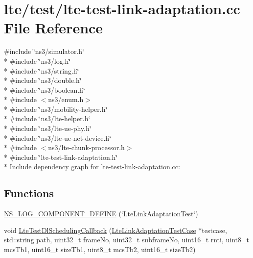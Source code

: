 \hypertarget{lte-test-link-adaptation_8cc}{}\section{lte/test/lte-\/test-\/link-\/adaptation.cc File Reference}
\label{lte-test-link-adaptation_8cc}
{\ttfamily \#include \char`\"{}ns3/simulator.\+h\char`\"{}}\\*
{\ttfamily \#include \char`\"{}ns3/log.\+h\char`\"{}}\\*
{\ttfamily \#include \char`\"{}ns3/string.\+h\char`\"{}}\\*
{\ttfamily \#include \char`\"{}ns3/double.\+h\char`\"{}}\\*
{\ttfamily \#include \char`\"{}ns3/boolean.\+h\char`\"{}}\\*
{\ttfamily \#include $<$ns3/enum.\+h$>$}\\*
{\ttfamily \#include \char`\"{}ns3/mobility-\/helper.\+h\char`\"{}}\\*
{\ttfamily \#include \char`\"{}ns3/lte-\/helper.\+h\char`\"{}}\\*
{\ttfamily \#include \char`\"{}ns3/lte-\/ue-\/phy.\+h\char`\"{}}\\*
{\ttfamily \#include \char`\"{}ns3/lte-\/ue-\/net-\/device.\+h\char`\"{}}\\*
{\ttfamily \#include $<$ns3/lte-\/chunk-\/processor.\+h$>$}\\*
{\ttfamily \#include \char`\"{}lte-\/test-\/link-\/adaptation.\+h\char`\"{}}\\*
Include dependency graph for lte-\/test-\/link-\/adaptation.cc\+:
\subsection*{Functions}
\begin{DoxyCompactItemize}
\item 
\hyperlink{lte-test-link-adaptation_8cc_a128cde1c677135f7fb31e226e208a8d9}{N\+S\+\_\+\+L\+O\+G\+\_\+\+C\+O\+M\+P\+O\+N\+E\+N\+T\+\_\+\+D\+E\+F\+I\+NE} (\char`\"{}Lte\+Link\+Adaptation\+Test\char`\"{})
\item 
void \hyperlink{lte-test-link-adaptation_8cc_ab208a94bcab8811af6875fa7750b8991}{Lte\+Test\+Dl\+Scheduling\+Callback} (\hyperlink{classLteLinkAdaptationTestCase}{Lte\+Link\+Adaptation\+Test\+Case} $\ast$testcase, std\+::string path, uint32\+\_\+t frame\+No, uint32\+\_\+t subframe\+No, uint16\+\_\+t rnti, uint8\+\_\+t mcs\+Tb1, uint16\+\_\+t size\+Tb1, uint8\+\_\+t mcs\+Tb2, uint16\+\_\+t size\+Tb2)
\end{DoxyCompactItemize}
